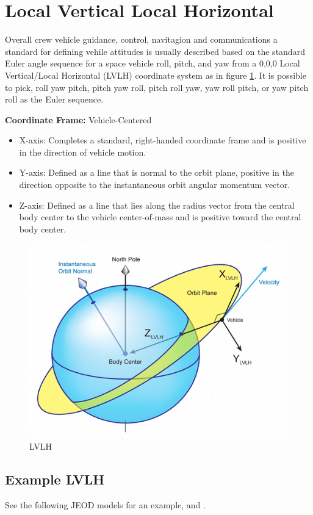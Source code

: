 
\section{Local Vertical Local Horizontal} \label{sec:lvlh} 
Overall crew vehicle guidance, control, navitagion and communications a standard for defining vehile attitudes is usually described based on the standard Euler angle sequence for a space vehicle roll, pitch, and yaw from a 0,0,0 Local Vertical/Local Horizontal (LVLH) coordinate system as in figure \ref{fig:9}. It is possible to pick, roll yaw pitch, pitch yaw roll, pitch roll yaw, yaw roll pitch, or yaw pitch roll as the Euler sequence.

\textbf{Coordinate Frame:} Vehicle-Centered

\begin{itemize}
\item X-axis: Completes a standard, right-handed coordinate frame and is positive in the direction of vehicle motion.
\item Y-axis: Defined as a line that is normal to the orbit plane, positive in the direction opposite to the instantaneous orbit angular momentum vector.
\item Z-axis: Defined as a line that lies along the radius vector from the central body center to the vehicle center-of-mass and is positive toward the central body center.
\end{itemize}

\begin{figure}[htp]
\centering
\includegraphics [width=7in]{figs/fig9.png}
\caption{LVLH}
\label{fig:9}
\end{figure}


\subsection{Example LVLH}

See the following JEOD models for an example,  and .



